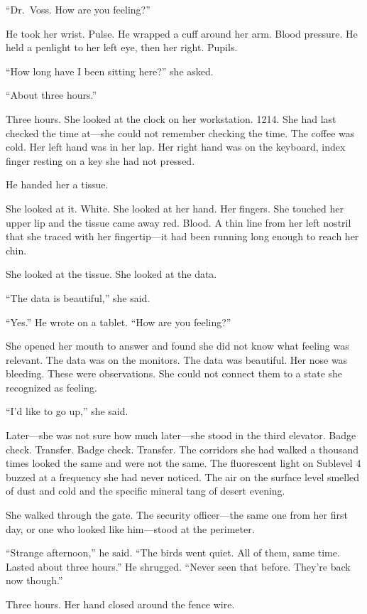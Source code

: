 ``Dr.\ Voss. How are you feeling?''

He took her wrist. Pulse. He wrapped a cuff around her arm. Blood pressure. He held a penlight to her left eye, then her right. Pupils.

``How long have I been sitting here?'' she asked.

``About three hours.''

Three hours. She looked at the clock on her workstation. 1214. She had last checked the time at---she could not remember checking the time. The coffee was cold. Her left hand was in her lap. Her right hand was on the keyboard, index finger resting on a key she had not pressed.

He handed her a tissue.

She looked at it. White. She looked at her hand. Her fingers. She touched her upper lip and the tissue came away red. Blood. A thin line from her left nostril that she traced with her fingertip---it had been running long enough to reach her chin.

She looked at the tissue. She looked at the data.

``The data is beautiful,'' she said.

``Yes.'' He wrote on a tablet. ``How are you feeling?''

She opened her mouth to answer and found she did not know what feeling was relevant. The data was on the monitors. The data was beautiful. Her nose was bleeding. These were observations. She could not connect them to a state she recognized as feeling.

``I'd like to go up,'' she said.

Later---she was not sure how much later---she stood in the third elevator. Badge check. Transfer. Badge check. Transfer. The corridors she had walked a thousand times looked the same and were not the same. The fluorescent light on Sublevel 4 buzzed at a frequency she had never noticed. The air on the surface level smelled of dust and cold and the specific mineral tang of desert evening.

She walked through the gate. The security officer---the same one from her first day, or one who looked like him---stood at the perimeter.

``Strange afternoon,'' he said. ``The birds went quiet. All of them, same time. Lasted about three hours.'' He shrugged. ``Never seen that before. They're back now though.''

Three hours. Her hand closed around the fence wire.

